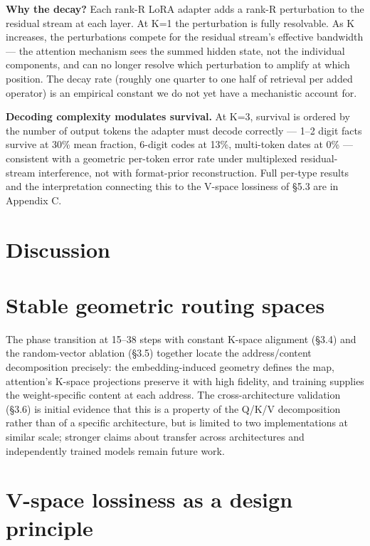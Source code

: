 \textbf{Why the decay?} Each rank-R LoRA adapter adds a rank-R perturbation to the residual stream at each layer. At K=1 the perturbation is fully resolvable. As K increases, the perturbations compete for the residual stream's effective bandwidth --- the attention mechanism sees the summed hidden state, not the individual components, and can no longer resolve which perturbation to amplify at which position. The decay rate (roughly one quarter to one half of retrieval per added operator) is an empirical constant we do not yet have a mechanistic account for.

\textbf{Decoding complexity modulates survival.} At K=3, survival is ordered by the number of output tokens the adapter must decode correctly --- 1--2 digit facts survive at 30\% mean fraction, 6-digit codes at 13\%, multi-token dates at 0\% --- consistent with a geometric per-token error rate under multiplexed residual-stream interference, not with format-prior reconstruction. Full per-type results and the interpretation connecting this to the V-space lossiness of \S 5.3 are in Appendix C.

\section{Discussion}\label{discussion}

\section{Stable geometric routing spaces}\label{stable-geometric-routing-spaces}

The phase transition at 15--38 steps with constant K-space alignment (\S 3.4) and the random-vector ablation (\S 3.5) together locate the address/content decomposition precisely: the embedding-induced geometry defines the map, attention's K-space projections preserve it with high fidelity, and training supplies the weight-specific content at each address. The cross-architecture validation (\S 3.6) is initial evidence that this is a property of the Q/K/V decomposition rather than of a specific architecture, but is limited to two implementations at similar scale; stronger claims about transfer across architectures and independently trained models remain future work.

\section{V-space lossiness as a design principle}\label{v-space-lossiness-as-a-design-principle}

